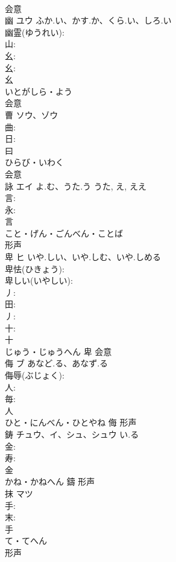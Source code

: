 \documentclass[8pt]{extreport}
\begin{document}
\begin{CJK}{UTF8}{min}
\\	会意 
\\	幽	ユウ	ふか.い、かす.か、くら.い、しろ.い		
\\	幽霊(ゆうれい): 
\\	山: 
\\	幺: 
\\	幺: 
\\	幺	
\\	いとがしら・よう	
\\	会意 
\\	曹	ソウ、ゾウ			
\\	曲: 
\\	日: 
\\	曰	
\\	ひらび・いわく	
\\	会意 
\\	詠	エイ	よ.む、うた.う	うた, え, ええ	
\\	言: 
\\	永: 
\\	言	
\\	こと・げん・ごんべん・ことば	
\\	形声 
\\	卑	ヒ	いや.しい、いや.しむ、いや.しめる		
\\	卑怯(ひきょう): 
\\	卑しい(いやしい): 
\\	丿: 
\\	田: 
\\	丿: 
\\	十: 
\\	十	
\\	じゅう・じゅうへん	卑	会意 
\\	侮	ブ	あなど.る、あなず.る		
\\	侮辱(ぶじょく): 
\\	人: 
\\	毎: 
\\	人	
\\	ひと・にんべん・ひとやね	侮	形声 
\\	鋳	チュウ、イ、シュ、シュウ	い.る		
\\	金: 
\\	寿: 
\\	金	
\\	かね・かねへん	鑄	形声 
\\	抹	マツ			
\\	手: 
\\	末: 
\\	手	
\\	て・てへん	
\\	形声 

\end{CJK}
\end{document}
